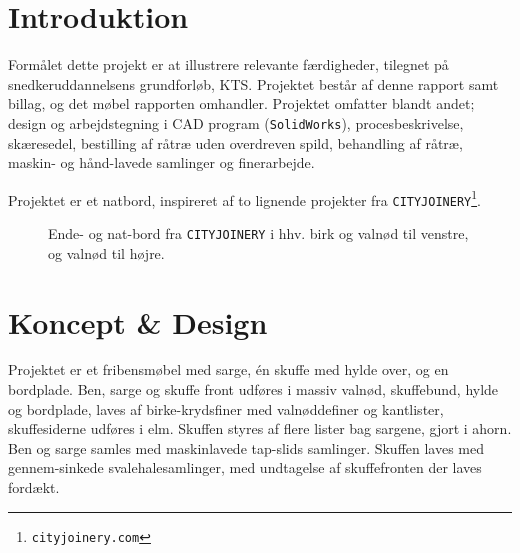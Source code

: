 \section*{Introduktion}
Formålet dette projekt er at illustrere relevante færdigheder, tilegnet på
snedkeruddannelsens grundforløb, KTS.
Projektet består af denne rapport samt billag, og det møbel rapporten omhandler.
Projektet omfatter blandt andet; design og arbejdstegning i CAD program
(\texttt{SolidWorks}), procesbeskrivelse, skæresedel, bestilling af råtræ uden
overdreven spild, behandling af råtræ, maskin- og hånd-lavede samlinger og finerarbejde.

Projektet er et natbord, inspireret af to lignende projekter fra
\texttt{CITYJOINERY}\nolinebreak \footnote{\texttt{cityjoinery.com}}.

\begin{figure}[htb]
\centering
{}
\caption{Ende- og nat-bord fra \texttt{CITYJOINERY} i hhv. birk og valnød til
venstre, og valnød til højre.}
\end{figure}

\section*{Koncept \& Design}
Projektet er et fribensmøbel med sarge, én skuffe med hylde over,
og en bordplade. Ben, sarge og skuffe front udføres i massiv valnød,
skuffebund, hylde og bordplade, laves af birke-krydsfiner med
valnøddefiner og kantlister, skuffesiderne udføres i elm. Skuffen styres af
flere lister bag sargene, gjort i ahorn. Ben og sarge samles med maskinlavede
tap-slids samlinger. Skuffen laves med gennem-sinkede svalehalesamlinger, med
undtagelse af skuffefronten der laves fordækt.

